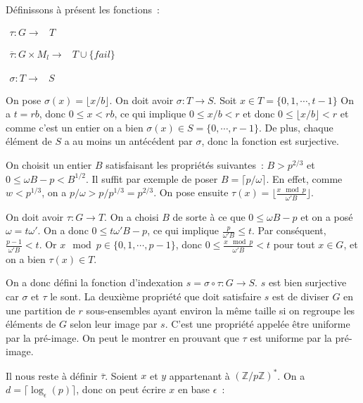    Définissons à présent les fonctions~:

    $\begin{array}{lrcl}
      \tau : G \longrightarrow & T
    \end{array}$

    $\begin{array}{lrcl}
      \overline{\tau} : G \times M_l \longrightarrow & T \cup \{fail\}
    \end{array}$

    $\begin{array}{lrcl}
      \sigma : T \longrightarrow & S
    \end{array}$

    On pose $\sigma(x) = \lfloor x/b \rfloor$. On doit avoir $\sigma : T \longrightarrow S$. Soit $x \in T = \{0,1,\cdots,t-1\}$ On a $t = rb$, donc $0 \leq x < rb$, ce qui implique $0 \leq x/b < r$ et donc $0 \leq \lfloor x/b \rfloor < r$ et comme c'est un entier on a bien $\sigma(x) \in S=\{0,\cdots,r-1\}$. De plus, chaque élément de $S$ a au moins un antécédent par $\sigma$, donc la fonction est surjective.

    On choisit un entier $B$ satisfaisant les propriétés suivantes~:  $B > p^{2/3}$ et $0 \leq \omega B - p < B^{1/2}$. Il suffit par exemple de poser $B = \lceil p/\omega \rceil$. En effet, comme $w < p^{1/3}$, on a $p/\omega > p/p^{1/3} = p^{2/3}$. On pose ensuite $\tau(x) = \lfloor \frac{x\mod p}{\omega' B} \rfloor$.

    On doit avoir $\tau : G \longrightarrow T$. On a choisi $B$ de sorte à ce que $0 \leq \omega B - p$ et on a posé $\omega = t\omega'$. On a donc $0 \leq t \omega' B - p$, ce qui implique $\frac{p}{\omega' B} \leq t$. Par conséquent, $\frac{p-1}{\omega' B} < t$. Or $x\mod p \in \{0,1,\cdots,p-1\}$, donc $0 \leq \frac{x\mod p}{\omega' B} < t$ pour tout $x \in G$, et on a bien $\tau(x) \in T$.

    On a donc défini la fonction d'indexation $s = \sigma \circ \tau : G \longrightarrow S$. $s$ est bien surjective car $\sigma$ et $\tau$ le sont. La deuxième propriété que doit satisfaire $s$ est de diviser $G$ en une partition de $r$ sous-ensembles ayant environ la même taille si on regroupe les éléments de $G$ selon leur image par $s$. C'est une propriété appelée être uniforme par la pré-image. On peut le montrer en prouvant que $\tau$ est uniforme par la pré-image.

    Il nous reste à définir $\overline{\tau}$. Soient $x$ et $y$ appartenant à $(\mathbb{Z}/p\mathbb{Z})^*$. On a $d = \lceil\log_\epsilon(p)\rceil$, donc on peut écrire $x$ en base $\epsilon$~:

